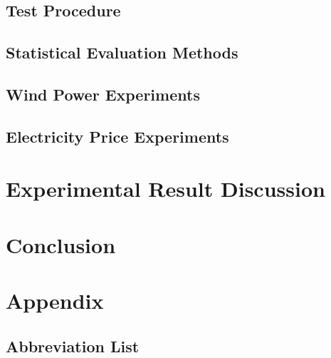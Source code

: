 \documentclass[twoside,11pt,openright]{report}
\begin{document}
\section{Test Procedure}
\label{sec:testProcedure}

\section{Statistical Evaluation Methods}
\label{sec:statisticalEvaluation}

\newpage
\section{Wind Power Experiments}
\label{sec:windProductionExperiments}

\newpage
\section{Electricity Price Experiments}
\label{sec:priceExperiments}

\newpage


\chapter{Experimental Result Discussion}
\label{ch:experimentalResultDiscussions}




\chapter{Conclusion}
\label{ch:conclusion}



 



\chapter{Appendix}
\label{ch:appendix}
\section{Abbreviation List}
\label{sec:abbreviationList}

\end{document}
